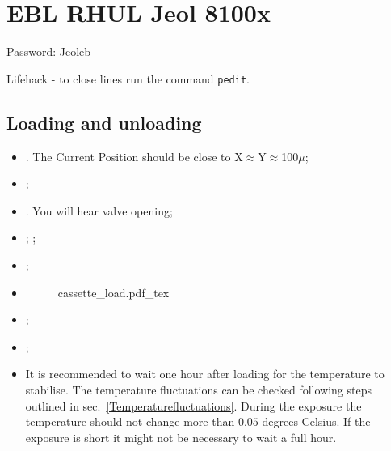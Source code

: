 
\section{EBL RHUL Jeol 8100x}
Password: Jeoleb%

\begin{framed}\noindent
  Lifehack - to close lines run the command \texttt{pedit}.
\end{framed}

\subsection{Loading and unloading}
\label{sec:loading-unloading}

\begin{itemize}
\item {}.    The  {Current   Position}  should  be   close  to
  X$\approx$Y$\approx$100$\mu$;
\item {};
\item {}. You will hear valve opening;
\item {};
  ;

\item  {};
\item {}
  \begin{figure}[h]
    \centering
    \def\svgwidth{6cm}{cassette_load.pdf_tex}
  \end{figure}

\item {};
\item {};
\item  It is  recommended  to wait  one hour  after  loading for  the
  temperature  to stabilise.   The  temperature  fluctuations can  be
  checked         following         steps         outlined         in
  sec.~\ref{Temperaturefluctuations}.    During   the  exposure   the
  temperature should not change more  than $0.05$ degrees Celsius. If
  the exposure  is short  it might  not be necessary  to wait  a full
  hour.
\end{itemize}

